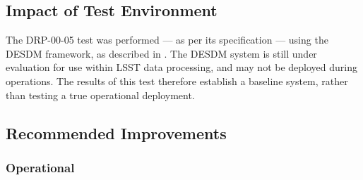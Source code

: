\documentclass[DM,lsstdraft,STR,toc]{lsstdoc}
\begin{document}
\subsection{Impact of Test Environment}
\label{sect:impact}

The DRP-00-05 test was performed --- as per its specification --- using the DESDM framework, as described in .
The DESDM system is still under evaluation for use within LSST data processing, and may not be deployed during operations.
The results of this test therefore establish a baseline system, rather than testing a true operational deployment.

\subsection{Recommended Improvements}
\label{sect:recommendations}

\subsubsection{Operational}
\end{document}
